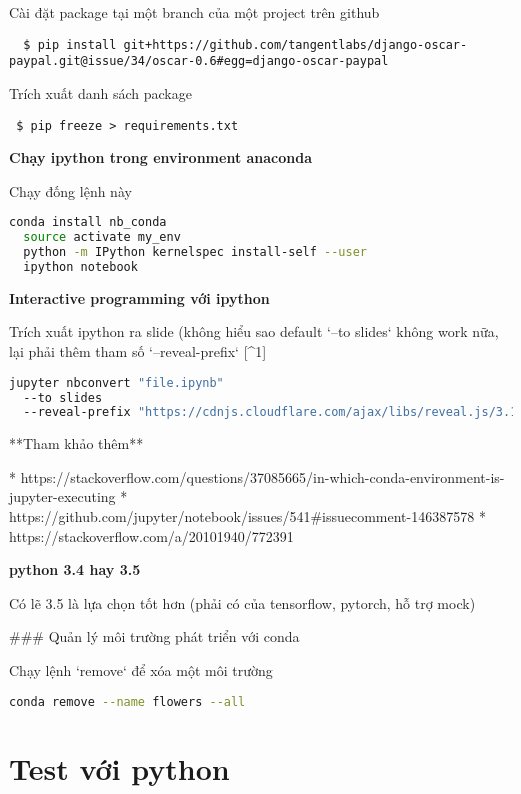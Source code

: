 \noindent Cài đặt package tại một branch của một project trên github

\begin{lstlisting}
  $ pip install git+https://github.com/tangentlabs/django-oscar-paypal.git@issue/34/oscar-0.6#egg=django-oscar-paypal
\end{lstlisting}

\noindent Trích xuất danh sách package

\begin{lstlisting}
 $ pip freeze > requirements.txt
\end{lstlisting}

\noindent \textbf{Chạy ipython trong environment anaconda}

\noindent Chạy đống lệnh này

\begin{lstlisting}[language=bash]
  conda install nb_conda
  source activate my_env
  python -m IPython kernelspec install-self --user
  ipython notebook
\end{lstlisting}

\noindent \textbf{Interactive programming với ipython}

\noindent Trích xuất ipython ra slide (không hiểu sao default `--to slides` không work nữa, lại phải thêm tham số `--reveal-prefix` [^1]

\begin{lstlisting}[language=bash]
jupyter nbconvert "file.ipynb"
  --to slides
  --reveal-prefix "https://cdnjs.cloudflare.com/ajax/libs/reveal.js/3.1.0"
\end{lstlisting}

**Tham khảo thêm**

* https://stackoverflow.com/questions/37085665/in-which-conda-environment-is-jupyter-executing
* https://github.com/jupyter/notebook/issues/541#issuecomment-146387578
* https://stackoverflow.com/a/20101940/772391

\noindent \textbf{python 3.4 hay 3.5}

Có lẽ 3.5 là lựa chọn tốt hơn (phải có của tensorflow, pytorch, hỗ trợ mock)

### Quản lý môi trường phát triển với conda

Chạy lệnh `remove` để xóa một môi trường

\begin{lstlisting}[language=bash]
conda remove --name flowers --all
\end{lstlisting}

\section{Test với python}


